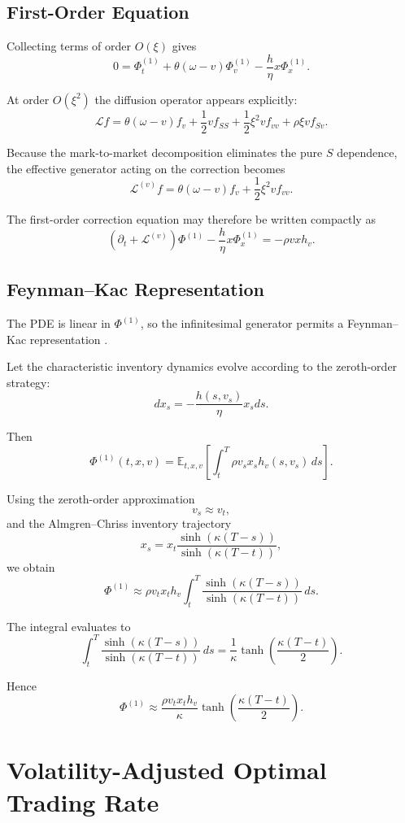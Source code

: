 \documentclass[11pt]{article}
\begin{document}
\subsection{First-Order Equation}

Collecting terms of order $O(\xi)$ gives
\[
0
=
\Phi_t^{(1)}
+
\theta(\omega-v)\Phi_v^{(1)}
-
\frac{h}{\eta}x\Phi_x^{(1)}.
\]

At order $O(\xi^2)$ the diffusion operator appears explicitly:
\[
\mathcal Lf
=
\theta(\omega-v)f_v
+
\frac12v f_{SS}
+
\frac12\xi^2vf_{vv}
+
\rho\xi vf_{Sv}.
\]

Because the mark-to-market decomposition eliminates the pure $S$ dependence, the effective generator acting on the correction becomes
\[
\boxed{
\mathcal L^{(v)}f
=
\theta(\omega-v)f_v
+
\frac12\xi^2vf_{vv}
}.
\]

The first-order correction equation may therefore be written compactly as
\[
\left(\partial_t + \mathcal L^{(v)}\right)\Phi^{(1)}
-
\frac{h}{\eta}x\Phi_x^{(1)}
=
-\rho vxh_v.
\]

\subsection{Feynman--Kac Representation}

The PDE is linear in $\Phi^{(1)}$, so the infinitesimal generator permits a Feynman--Kac representation \cite{karatzas1998brownian}.

Let the characteristic inventory dynamics evolve according to the zeroth-order strategy:
\[
dx_s
=
-
\frac{h(s,v_s)}{\eta}x_sds.
\]

Then \cite{karatzas1998brownian}
\[
\boxed{
\Phi^{(1)}(t,x,v)
=
\mathbb E_{t,x,v}
\left[
\int_t^T
\rho v_sx_sh_v(s,v_s)
\,ds
\right].
}
\]

Using the zeroth-order approximation
\[
v_s \approx v_t,
\]
and the Almgren--Chriss inventory trajectory
\[
x_s
=
 x_t
 \frac{\sinh(\kappa(T-s))}{\sinh(\kappa(T-t))},
\]
we obtain
\[
\Phi^{(1)}
\approx
\rho v_tx_th_v
\int_t^T
\frac{\sinh(\kappa(T-s))}{\sinh(\kappa(T-t))}
\,ds.
\]

The integral evaluates to
\[
\int_t^T
\frac{\sinh(\kappa(T-s))}{\sinh(\kappa(T-t))}
\,ds
=
\frac{1}{\kappa}
\tanh\left(\frac{\kappa(T-t)}{2}\right).
\]

Hence
\[
\boxed{
\Phi^{(1)}
\approx
\frac{\rho v_tx_th_v}{\kappa}
\tanh\left(\frac{\kappa(T-t)}{2}\right)
}.
\]

\section{Volatility-Adjusted Optimal Trading Rate}
\end{document}
